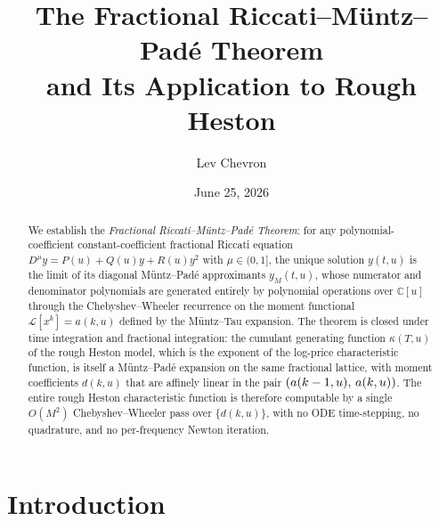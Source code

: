 \documentclass{article}
\newcommand{\tmem}[1]{{\em #1\/}}
\newcommand{\C}{\mathbb{C}}
\newcommand{\Lk}{\mathcal{L}}
\begin{document}
\title{
  The Fractional Riccati--M{\"u}ntz--Pad{\'e} Theorem\\
  and Its Application to Rough Heston
}

\author{Lev Chevron}

\date{June 25, 2026}

\maketitle

\begin{abstract}
  We establish the {\tmem{Fractional Riccati--M{\"u}ntz--Pad{\'e} Theorem}}:
  for any polynomial-coefficient constant-coefficient fractional Riccati
  equation $D^{\mu} y = P (u) + Q (u) y + R (u) y^2$ with $\mu \in (0, 1]$,
  the unique solution $y (t, u)$ is the limit of its diagonal
  M{\"u}ntz--Pad{\'e} approximants $y_M (t, u)$, whose numerator and
  denominator polynomials are generated entirely by polynomial operations over
  $\C [u]$ through the Chebyshev--Wheeler recurrence on the moment functional
  $\Lk [x^k] = a (k, u)$ defined by the M{\"u}ntz--Tau expansion. The theorem
  is closed under time integration and fractional integration: the cumulant
  generating function $\kappa (T, u)$ of the rough Heston model, which is the
  exponent of the log-price characteristic function, is itself a
  M{\"u}ntz--Pad{\'e} expansion on the same fractional lattice, with moment
  coefficients $d (k, u)$ that are affinely linear in the pair $(a (k - 1, u),
  \hspace{0.17em} a (k, u))$. The entire rough Heston characteristic function
  is therefore computable by a single $O (M^2)$ Chebyshev--Wheeler pass over
  $\{d (k, u)\}$, with no ODE time-stepping, no quadrature, and no
  per-frequency Newton iteration.
\end{abstract}

{\tableofcontents}

\section{Introduction}\label{sec:intro}
\end{document}
